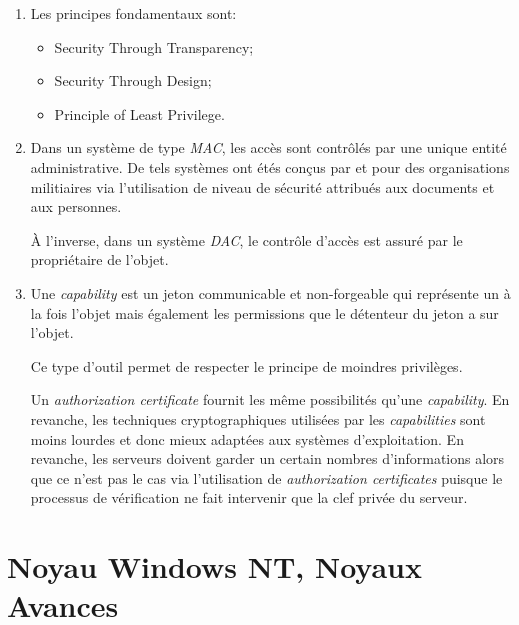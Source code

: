 \begin{correction}

\begin{enumerate}
  \item
    Les principes fondamentaux sont:

    \begin{itemize}
      \item
        Security Through Transparency;
      \item
        Security Through Design;
      \item
        Principle of Least Privilege.
    \end{itemize}
  \item
    Dans un syst\`eme de type \textit{MAC}, les acc\`es sont contr\^ol\'es
    par une unique entit\'e administrative. De tels syst\`emes ont \'et\'es
    con\c{c}us par et pour des organisations militiaires via l'utilisation
    de niveau de s\'ecurit\'e attribu\'es aux documents et aux personnes.

    \`A l'inverse, dans un syst\`eme \textit{DAC}, le contr\^ole d'acc\`es
    est assur\'e par le propri\'etaire de l'objet.
  \item
    Une \textit{capability} est un jeton communicable et non-forgeable qui
    repr\'esente un \`a la fois l'objet mais \'egalement les permissions
    que le d\'etenteur du jeton a sur l'objet.

    Ce type d'outil permet de respecter le principe de moindres privil\`eges.

    Un \textit{authorization certificate} fournit les m\^eme possibilit\'es
    qu'une \textit{capability}. En revanche, les techniques cryptographiques
    utilis\'ees par les \textit{capabilities} sont moins lourdes et donc mieux
    adapt\'ees aux syst\`emes d'exploitation. En revanche, les serveurs doivent
    garder un certain nombres d'informations alors que ce n'est pas le cas
    via l'utilisation de \textit{authorization certificates} puisque le
    processus de v\'erification ne fait intervenir que la clef priv\'ee du
    serveur.
\end{enumerate}

\end{correction}

%
%

\section{Noyau Windows NT, Noyaux Avances
         }

